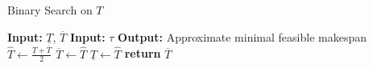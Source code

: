 \begin{algorithm}[!t]
\caption{Binary Search on \(T\)}
\label{alg:binary_search}
\begin{algorithmic}
\STATE \textbf{Input:} \(\underline{T}\), \(\overline{T}\) 
\STATE \textbf{Input:} \(\tau\) 
\STATE \textbf{Output:} Approximate minimal feasible makespan
    \STATE \(\hat{T} \leftarrow \frac{\underline{T} + \overline{T}}{2}\)
        \STATE \(\overline{T} \leftarrow \hat{T}\) 
    \ELSE
        \STATE \(\underline{T} \leftarrow \hat{T}\) 
    \ENDIF
\ENDWHILE
\STATE \textbf{return} \(\overline{T}\)
\end{algorithmic}
\end{algorithm}